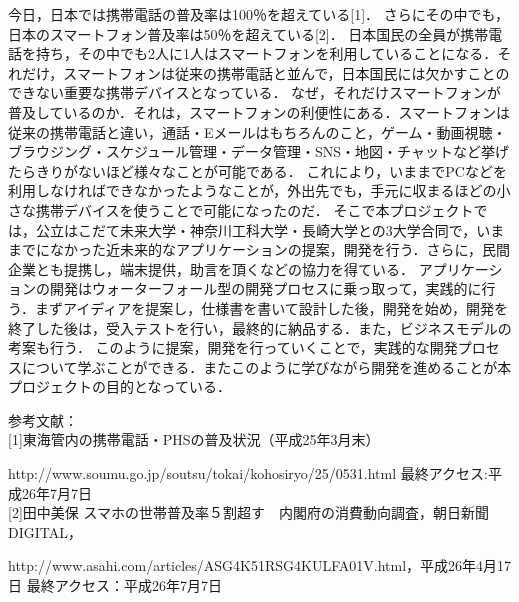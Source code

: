 \begin{jabstract}
今日，日本では携帯電話の普及率は100％を超えている[1]． さらにその中でも，日本のスマートフォン普及率は50％を超えている[2]． 日本国民の全員が携帯電話を持ち，その中でも2人に1人はスマートフォンを利用していることになる．それだけ，スマートフォンは従来の携帯電話と並んで，日本国民には欠かすことのできない重要な携帯デバイスとなっている．
なぜ，それだけスマートフォンが普及しているのか．それは，スマートフォンの利便性にある．スマートフォンは従来の携帯電話と違い，通話・Eメールはもちろんのこと，ゲーム・動画視聴・ブラウジング・スケジュール管理・データ管理・SNS・地図・チャットなど挙げたらきりがないほど様々なことが可能である．
これにより，いままでPCなどを利用しなければできなかったようなことが，外出先でも，手元に収まるほどの小さな携帯デバイスを使うことで可能になったのだ．
そこで本プロジェクトでは，公立はこだて未来大学・神奈川工科大学・長崎大学との3大学合同で，いままでになかった近未来的なアプリケーションの提案，開発を行う．さらに，民間企業とも提携し，端末提供，助言を頂くなどの協力を得ている．
アプリケーションの開発はウォーターフォール型の開発プロセスに乗っ取って，実践的に行う．まずアイディアを提案し，仕様書を書いて設計した後，開発を始め，開発を終了した後は，受入テストを行い，最終的に納品する．また，ビジネスモデルの考案も行う．
このように提案，開発を行っていくことで，実践的な開発プロセスについて学ぶことができる．またこのように学びながら開発を進めることが本プロジェクトの目的となっている．

参考文献：\\[1mm]
[1]東海管内の携帯電話・PHSの普及状況（平成25年3月末）
\par 
http://www.soumu.go.jp/soutsu/tokai/kohosiryo/25/0531.html
最終アクセス:平成26年7月7日
\\[1mm] 
[2]田中美保 スマホの世帯普及率５割超す　内閣府の消費動向調査，朝日新聞DIGITAL，
\par
http://www.asahi.com/articles/ASG4K51RSG4KULFA01V.html，平成26年4月17日 最終アクセス：平成26年7月7日

\end{jabstract}
